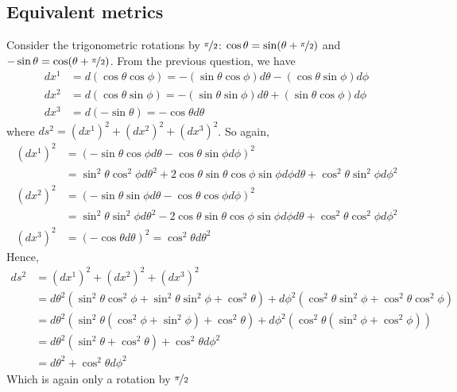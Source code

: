 \documentclass{article}
\begin{document}
		\subsection{Equivalent metrics}
			Consider the trigonometric rotations by $\nicefrac\pi2$: $\cos\theta = \sin (\theta + \nicefrac\pi2)$ and $-\sin\theta = \cos (\theta + \nicefrac\pi2)$. From the previous question, we have
			\begin{align*}
				dx^1 &= d(\cos \theta \cos \phi) = -(\sin\theta \cos \phi) d\theta - (\cos \theta \sin \phi)d \phi \\
				dx^2 &= d(\cos \theta \sin \phi) = -(\sin \theta \sin \phi) d\theta + (\sin \theta \cos \phi) d \phi \\
				dx^3 &= d(-\sin\theta) = -\cos \theta d\theta
			\end{align*}
			where $ ds^2 = (dx^1)^2+(dx^2)^2+(dx^3)^2$. So again,
			\begin{align*}
				(dx^1)^2 &= (-\sin\theta \cos \phi d \theta - \cos \theta \sin \phi d \phi)^2 \\
				&= \sin^2 \theta \cos^2 \phi d\theta^2 + 2 \cos \theta \sin \theta \cos \phi \sin \phi d \phi d \theta + \cos^2\theta \sin^2\phi d\phi^2 \\
				(dx^2)^2 &= (-\sin\theta \sin \phi d \theta - \cos \theta \cos \phi d \phi)^2 \\
				&= \sin^2 \theta \sin^2 \phi d\theta^2 - 2 \cos \theta \sin \theta \cos \phi \sin \phi d \phi d \theta + \cos^2\theta \cos^2\phi d\phi^2 \\
				(dx^3)^2 &= (-\cos\theta d \theta)^2 = \cos^2 \theta d \theta^2
			\end{align*}
			Hence,
			\begin{align*}
				ds^2 &= (dx^1)^2+(dx^2)^2+(dx^3)^2 \\
				&= d\theta^2 \left( \sin^2 \theta \cos^2 \phi + \sin^2 \theta \sin^2 \phi + \cos^2 \theta \right) + d\phi^2 \left( \cos^2 \theta \sin^2 \phi + \cos^2 \theta \cos^2 \phi \right) \\
				&= d\theta^2 \left( \sin^2 \theta (\cos^2 \phi + \sin^2 \phi) + \cos^2 \theta \right) + d\phi^2 \left( \cos^2 \theta (\sin^2 \phi + \cos^2 \phi) \right) \\
				&= d\theta^2 \left( \sin^2\theta + \cos^2 \theta \right) + \cos^2 \theta d\phi^2 \\
				&= d\theta^2 + \cos^2\theta d\phi^2
			\end{align*}
			Which is again only a rotation by $\nicefrac\pi2$
	\pagebreak
\end{document}
